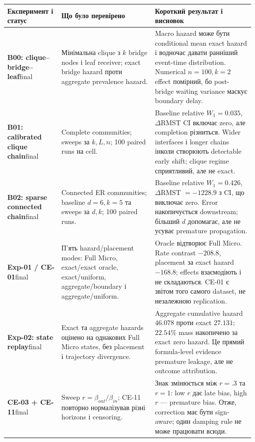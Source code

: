 \documentclass[11pt,a4paper]{article}
\begin{document}
\footnotesize
\setlength{\tabcolsep}{3pt}
\begin{longtable}{p{2.25cm}p{5.25cm}p{6.15cm}}
\toprule
Експеримент і статус & Що було перевірено & Короткий результат і висновок\\
\midrule
\endhead
\textbf{B00: clique--bridge--leaf}\newline final
& Мінімальна clique з $k$ bridge nodes і leaf receiver; exact bridge hazard проти aggregate prevalence hazard.
& Macro hazard може бути conditional mean exact hazard і водночас давати ранніший event-time distribution. Numerical $n=100,k=2$ effect помірний, бо post-bridge waiting variance маскує boundary delay.\\

\textbf{B01: calibrated clique chain}\newline final
& Complete communities; sweeps за $k,L,n$; 100 paired runs на cell.
& Baseline relative $W_1=0.035$, $\Delta$RMST CI включає zero, але completion різниться. Wider interfaces і longer chains інколи створюють detectable early shift; clique regime сприятливий, але не exact.\\

\textbf{B02: sparse connected chain}\newline final
& Connected ER communities; baseline $d=6,k=5$ та sweeps за $d,k$; 100 paired runs.
& Baseline relative $W_1=0.426$, $\Delta$RMST $=-1228.9$ з CI, що виключає zero. Error накопичується downstream; більший $d$ допомагає, але не усуває premature propagation.\\

\textbf{Exp-01 / CE-01}\newline final
& П'ять hazard/placement modes: Full Micro, exact/exact oracle, exact/uniform, aggregate/boundary і aggregate/uniform.
& Oracle відтворює Full Micro. Rate contrast $-208.8$, placement за exact hazard $-168.8$; effects взаємодіють і не складаються. CE-01 є звітом того самого dataset, не незалежною replication.\\

\textbf{Exp-02: state replay}\newline final
& Exact та aggregate hazards оцінено на однакових Full Micro states, без placement і trajectory divergence.
& Aggregate cumulative hazard $46.078$ проти exact $27.131$; $22.54\%$ mass накопичено за exact zero hazard. Це прямий formula-level evidence premature leakage, але не outcome attribution.\\

\textbf{CE-03 + CE-11}\newline final
& Sweep $r=\beta_{out}/\beta_{in}$; CE-11 повторно нормалізував різні horizons і censoring.
& Знак змінюється між $r=.3$ та $r=1$: low $r$ дає late bias, high $r$ --- premature bias. Отже, correction має бути sign-aware; один damping rule не може працювати всюди.\\


\end{longtable}
\end{document}
